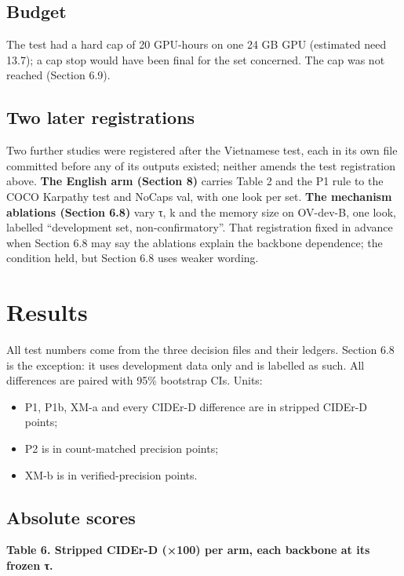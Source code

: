 \documentclass[manuscript,screen]{acmart}
\providecommand{\tightlist}{\setlength{\itemsep}{0pt}\setlength{\parskip}{0pt}}
\begin{document}
\subsection{Budget}\label{budget}

The test had a hard cap of 20 GPU-hours on one 24 GB GPU (estimated need 13.7); a cap stop would
have been final for the set concerned. The cap was not reached (Section 6.9).

\subsection{Two later registrations}\label{two-later-registrations}

Two further studies were registered after the Vietnamese test, each in its own file committed before
any of its outputs existed; neither amends the test registration above. \textbf{The English arm
(Section 8)} carries Table 2 and the P1 rule to the COCO Karpathy test and NoCaps val, with one look
per set. \textbf{The mechanism ablations (Section 6.8)} vary τ, k and the memory size on OV-dev-B,
one look, labelled ``development set, non-confirmatory''. That registration fixed in advance when
Section 6.8 may say the ablations explain the backbone dependence; the condition held, but Section
6.8 uses weaker wording.

\section{Results}\label{results}

All test numbers come from the three decision files and their ledgers. Section 6.8 is the exception:
it uses development data only and is labelled as such. All differences are paired with 95\%
bootstrap CIs. Units:

\begin{itemize}
\tightlist
\item
  P1, P1b, XM-a and every CIDEr-D difference are in stripped CIDEr-D points;
\item
  P2 is in count-matched precision points;
\item
  XM-b is in verified-precision points.
\end{itemize}

\subsection{Absolute scores}\label{absolute-scores}

\textbf{Table 6. Stripped CIDEr-D (×100) per arm, each backbone at its frozen τ.}
\end{document}
